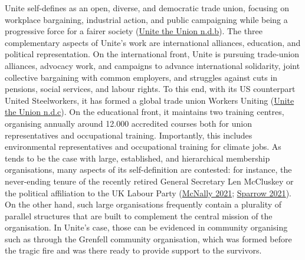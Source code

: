 \documentclass[a4paper, nobind]{templates/ociamthesis}
\begin{document}
Unite self-defines as an open, diverse, and democratic trade union, focusing on workplace bargaining, industrial action, and public campaigning while being a progressive force for a fairer society (\protect\hyperlink{ref-unite_the_union_vision_}{Unite the Union n.d.b}). The three complementary aspects of Unite's work are international alliances, education, and political representation. On the international front, Unite is pursuing trade-union alliances, advocacy work, and campaigns to advance international solidarity, joint collective bargaining with common employers, and struggles against cuts in pensions, social services, and labour rights. To this end, with its US counterpart United Steelworkers, it has formed a global trade union Workers Uniting (\protect\hyperlink{ref-unite_the_union_workers_}{Unite the Union n.d.c}). On the educational front, it maintains two training centres, organising annually around 12.000 accredited courses both for union representatives and occupational training. Importantly, this includes environmental representatives and occupational training for climate jobs. As tends to be the case with large, established, and hierarchical membership organisations, many aspects of its self-definition are contested: for instance, the never-ending tenure of the recently retired General Secretary Len McCluskey or the political affiliation to the UK Labour Party (\protect\hyperlink{ref-mcnally_big_2021}{McNally 2021}; \protect\hyperlink{ref-sparrow_unite_2021}{Sparrow 2021}). On the other hand, such large organisations frequently contain a plurality of parallel structures that are built to complement the central mission of the organisation. In Unite's case, those can be evidenced in community organising such as through the Grenfell community organisation, which was formed before the tragic fire and was there ready to provide support to the survivors.
\end{document}
